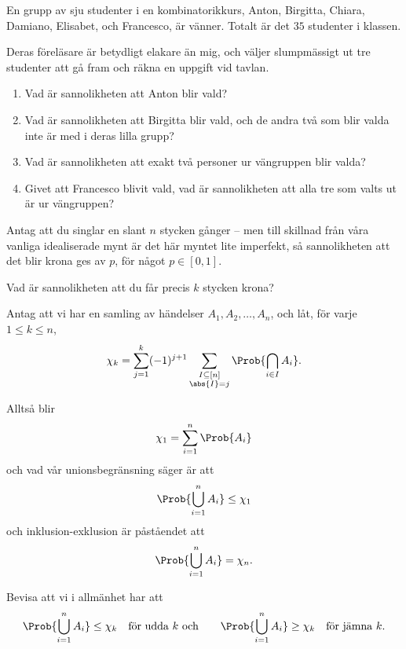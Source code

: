 \documentclass[nobib]{tufte-handout}
\begin{document}
\begin{xca}
    En grupp av sju studenter i en kombinatorikkurs, Anton, Birgitta, Chiara, Damiano, Elisabet, och Francesco, är vänner. Totalt är det $35$ studenter i klassen.

    Deras föreläsare är betydligt elakare än mig, och väljer slumpmässigt ut tre studenter att gå fram och räkna en uppgift vid tavlan.

    \begin{enumerate}
        \item Vad är sannolikheten att Anton blir vald?
        \item Vad är sannolikheten att Birgitta blir vald, och de andra två som blir valda inte är med i deras lilla grupp?
        \item Vad är sannolikheten att exakt två personer ur vängruppen blir valda?
        \item Givet att Francesco blivit vald, vad är sannolikheten att alla tre som valts ut är ur vängruppen?
    \end{enumerate}
\end{xca}

\begin{xca}
    Antag att du singlar en slant $n$ stycken gånger -- men till skillnad från våra vanliga idealiserade mynt är det här myntet lite imperfekt, så sannolikheten att det blir krona ges av $p$, för något $p \in [0,1]$.

    Vad är sannolikheten att du får precis $k$ stycken krona?
\end{xca}

\begin{xca}
    Antag att vi har en samling av händelser $A_1, A_2, \ldots, A_n$, och låt, för varje $1 \leq k \leq n$,
    $$\chi_k = \sum_{j=1}^{k} (-1)^{j+1}\sum_{\substack{I \subseteq [n]\\\abs{I} = j}} \Prob{\bigcap_{i\in I} A_i}.$$
    
    Alltså blir
    $$\chi_1 = \sum_{i=1}^{n} \Prob{A_i}$$
    och vad vår unionsbegränsning säger är att
    $$\Prob{\bigcup_{i=1}^n A_i} \leq \chi_1$$
    och inklusion-exklusion är påståendet att
    $$\Prob{\bigcup_{i=1}^n A_i} = \chi_n.$$

    Bevisa att vi i allmänhet har att
    $$\Prob{\bigcup_{i=1}^n A_i} \leq \chi_k\quad\text{för udda } k\text{ och}\qquad\Prob{\bigcup_{i=1}^n A_i} \geq \chi_k\quad\text{för jämna }k.$$
\end{xca}

%
%
\end{document}
